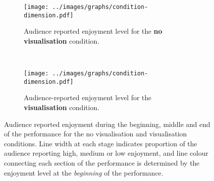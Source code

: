 \begin{figure}
\centering
\begin{subfigure}{\textwidth}
  \centering
  \texttt{[image: ../images/graphs/condition-dimension.pdf]}
  \caption[No visualisation condition enjoyment detailed survey results]{Audience reported enjoyment level for the \textbf{no visualisation} condition.}
  \label{fig:no-visualisation-enjoyment}
\end{subfigure}\\
\vspace{15mm}
\begin{subfigure}{\textwidth}
  \centering
  \texttt{[image: ../images/graphs/condition-dimension.pdf]}
  \caption[Visualisation condition enjoyment detailed survey results]{Audience-reported enjoyment level for the \textbf{visualisation} condition.}
  \label{fig:visualisation-enjoyment}
\end{subfigure}
\vspace{15mm}
\caption[Follow-up user study enjoyment survey responses]{Audience reported enjoyment during the beginning, middle and end of the performance for the no visualisation and visualisation conditions. Line width at each stage indicates proportion of the audience reporting high, medium or low enjoyment, and line colour connecting each section of the performance is determined by the enjoyment level at the \emph{beginning} of the performance.}
\label{fig:follow-up-user-study-condition-enjoyment}
\end{figure}